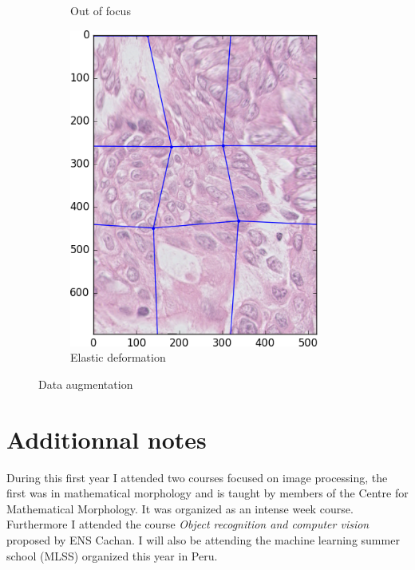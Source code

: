 \documentclass[a4paper,10pt]{article}
\begin{document}
\begin{figure}
\begin{multicols}{3}
\begin{subfigure}{0.3\textwidth}
    \caption{Out of focus}
    \label{fig:blur}
	\end{subfigure}%
	\begin{subfigure}{0.3\textwidth}
    \includegraphics[width=0.9\textwidth]{ELAST.png}\par 
     \caption{Elastic deformation}
     \label{fig:elastic}
	\end{subfigure}%
\end{multicols}
\caption{Data augmentation}
\end{figure}

\section{Additionnal notes}

During this first year I attended two courses focused on image
processing, the first was in mathematical morphology and is taught by
members of the Centre for Mathematical Morphology. It was organized as
an intense week course. Furthermore I attended the course
\textit{Object recognition and computer vision} proposed by ENS
Cachan.  
I will also be attending the machine learning summer school (MLSS)
organized this year in Peru. 
\end{document}
